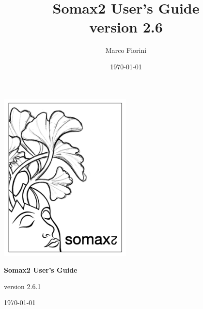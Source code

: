 \documentclass[11pt, a4paper]{report}
\title{Somax2 User's Guide\\[0.24cm]
	\large{version 2.6}}
\author{Marco Fiorini}
\date{\today}
\begin{document}
\begin{titlepage}
	\centering

\includegraphics[width=0.5\textwidth]{img/somax_logo.png}\par\vspace{1cm}

{\huge\bfseries Somax2 User's Guide\par}
\vspace{20pt}
{\large{version 2.6.1}}

\vfill

{\large \today\par}
\end{titlepage}


\tableofcontents







\end{document}
